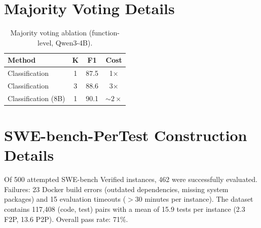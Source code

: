 \documentclass[11pt,a4paper]{article}
\begin{document}
\appendix
\section{Majority Voting Details}

\begin{table}[h]
\centering
\small
\caption{Majority voting ablation (function-level, Qwen3-4B).}
\label{tab:voting}
\begin{tabular}{lccc}
\toprule
\textbf{Method} & $\boldsymbol{K}$ & \textbf{F1} & \textbf{Cost} \\
\midrule
Classification & 1 & 87.5 & 1$\times$ \\
Classification & 3 & 88.6 & 3$\times$ \\
Classification (8B) & 1 & 90.1 & ${\sim}2\times$ \\
\bottomrule
\end{tabular}
\end{table}

\section{SWE-bench-PerTest Construction Details}

Of 500 attempted SWE-bench Verified instances, 462 were successfully evaluated. Failures: 23 Docker build errors (outdated dependencies, missing system packages) and 15 evaluation timeouts ($>$30 minutes per instance). The dataset contains 117{,}408 (code, test) pairs with a mean of 15.9 tests per instance (2.3 F2P, 13.6 P2P). Overall pass rate: 71\%.
\end{document}
